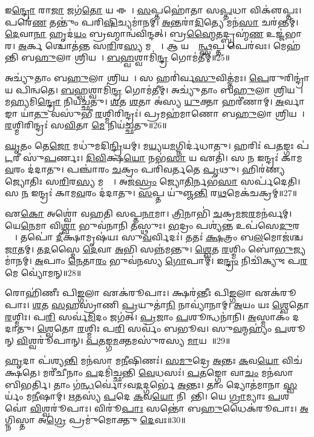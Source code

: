 𑌇\ul{𑌨𑍍𑌦𑍍𑌰𑍋} 𑌰𑌾\ul{𑌜𑌾} 𑌜𑌗॑\ul{𑌤𑍋} 𑌯 𑌈𑌶𑍇᳚। 
\ul{𑌸}𑌪𑍍𑌤𑌹𑍋॑𑌤𑌾 𑌸\ul{𑌪𑍍𑌤}𑌧𑌾 𑌵𑌿𑌕𑍢॑𑌪𑍍𑌤𑌃। 
𑌪𑌰𑍇॑\ul{𑌣} 𑌤𑌨𑍍𑌤𑍁𑌂॑ 𑌪𑌰𑌿\ul{𑌷𑌿}𑌚𑍍𑌯𑌮𑌾॑𑌨𑌮𑍍। 
\ul{𑌅}𑌨𑍍𑌤𑌰𑌾॑\ul{𑌦𑌿}𑌤𑍍𑌯𑍇 𑌮𑌨॑\ul{𑌸𑌾} 𑌚𑌰॑𑌨𑍍𑌤𑌮𑍍। 
\ul{𑌦𑍇}𑌵𑌾\ul{𑌨𑌾}\ul{} 𑌹𑍃𑌦॑\ul{𑌯𑌂} 𑌬𑍍𑌰𑌹𑍍𑌮𑌾𑌨𑍍𑌵॑𑌵𑌿𑌨𑍍𑌦𑌤𑍍। 
𑌬𑍍𑌰\ul{𑌹𑍍𑌮𑍈}𑌤𑌦𑍍𑌬𑍍𑌰𑌹𑍍𑌮॑\ul{𑌣} 𑌉𑌜𑍍𑌜॑𑌭𑌾𑌰। 
\ul{𑌅}𑌰𑍍𑌕 𑌶𑍍𑌚𑍋𑌤॑𑌨𑍍𑌤 𑌸\ul{𑌰𑌿}𑌰\ul{𑌸𑍍𑌯} 𑌮𑌧𑍍𑌯𑍇᳚। 
𑌆 𑌯𑌸𑍍𑌮𑌿᳚\ul{𑌨𑍍𑌥𑍍𑌸}𑌪𑍍𑌤 𑌪𑍇𑌰॑𑌵𑌃। 
𑌮𑍇𑌹॑𑌨𑍍𑌤𑌿 𑌬\ul{𑌹𑍁}𑌲𑌾 𑌶𑍍𑌰𑌿𑌯𑌮𑍍᳚। 
\ul{𑌬}\ul{𑌹𑍍𑌵}𑌶𑍍𑌵𑌾𑌮𑌿॑\ul{𑌨𑍍𑌦𑍍𑌰} 𑌗𑍋𑌮॑𑌤𑍀𑌮𑍍॥25॥%

𑌅𑌚𑍍𑌯𑍁॑𑌤𑌾𑌂 𑌬\ul{𑌹𑍁}𑌲𑌾 𑌶𑍍𑌰𑌿𑌯𑌮𑍍᳚। 
𑌸 𑌹𑌰𑌿॑𑌰𑍍𑌵\ul{𑌸𑍁}𑌵𑌿𑌤𑍍𑌤॑𑌮𑌃। 
\ul{𑌪𑍇}𑌰𑍁𑌰𑌿𑌨𑍍𑌦𑍍𑌰𑌾॑𑌯 𑌪𑌿𑌨𑍍𑌵𑌤𑍇। 
\ul{𑌬}\ul{𑌹𑍍𑌵}𑌶𑍍𑌵𑌾𑌮𑌿॑\ul{𑌨𑍍𑌦𑍍𑌰} 𑌗𑍋𑌮॑𑌤𑍀𑌮𑍍। 
𑌅𑌚𑍍𑌯𑍁॑𑌤𑌾𑌂 𑌬\ul{𑌹𑍁}𑌲𑌾 𑌶𑍍𑌰𑌿𑌯𑌮𑍍᳚। 
𑌮\ul{𑌹𑍍𑌯}𑌮𑌿\ul{𑌨𑍍𑌦𑍍𑌰𑍋} 𑌨𑌿𑌯॑𑌚𑍍𑌛𑌤𑍁। 
\ul{𑌶}𑌤 \ul{𑌶}𑌤𑌾 𑌅॑𑌸𑍍𑌯 \ul{𑌯𑍁}𑌕𑍍𑌤𑌾 𑌹𑌰𑍀॑𑌣𑌾𑌮𑍍। 
\ul{𑌅}𑌰𑍍𑌵𑌾𑌙𑌾 𑌯𑌾॑\ul{𑌤𑍁} 𑌵𑌸𑍁॑𑌭𑍀 \ul{𑌰}𑌶𑍍𑌮𑌿𑌰𑌿𑌨𑍍𑌦𑍍𑌰𑌃॑। 
𑌪𑍍𑌰𑌮𑌹॑𑌮𑌾𑌣𑍋 𑌬\ul{𑌹𑍁}𑌲𑌾 𑌶𑍍𑌰𑌿𑌯𑌮𑍍᳚। 
\ul{𑌰}𑌶𑍍𑌮𑌿𑌰𑌿𑌨𑍍𑌦𑍍𑌰𑌃॑ 𑌸\ul{𑌵𑌿}𑌤𑌾 \ul{𑌮𑍇} 𑌨𑌿𑌯॑𑌚𑍍𑌛𑌤𑍁॥26॥%

\ul{𑌘𑍃}𑌤𑌂 𑌤𑍇\ul{𑌜𑍋} 𑌮𑌧𑍁॑𑌮𑌦𑌿\ul{𑌨𑍍𑌦𑍍𑌰𑌿}𑌯𑌮𑍍। 
𑌮\ul{𑌯𑍍𑌯}𑌯\ul{𑌮}𑌗𑍍𑌨𑌿𑌰𑍍𑌦॑𑌧𑌾𑌤𑍁। 
𑌹𑌰𑌿𑌃॑ 𑌪\ul{𑌤}𑌙𑍍𑌗𑌃 𑌪॑\ul{𑌟}𑌰𑍀 𑌸𑍁॑\ul{𑌪}𑌰𑍍𑌣𑌃। 
\ul{𑌦𑌿}\ul{𑌵𑌿}𑌕𑍍𑌷\ul{𑌯𑍋} 𑌨𑌭॑\ul{𑌸𑌾} 𑌯 𑌏𑌤𑌿॑। 
𑌸 \ul{𑌨} 𑌇𑌨𑍍𑌦𑍍𑌰𑌃॑ 𑌕𑌾𑌮\ul{𑌵}𑌰𑌂 𑌦॑𑌦𑌾𑌤𑍁। 
𑌪𑌞𑍍𑌚𑌾॑𑌰𑌂 \ul{𑌚}𑌕𑍍𑌰𑌂 𑌪𑌰𑌿॑𑌵𑌰𑍍𑌤𑌤𑍇 \ul{𑌪𑍃}𑌥𑍁। 
𑌹𑌿𑌰॑𑌣𑍍𑌯𑌜𑍍𑌯𑍋𑌤𑌿𑌃 𑌸\ul{𑌰𑌿}𑌰\ul{𑌸𑍍𑌯} 𑌮𑌧𑍍𑌯𑍇᳚। 
𑌅𑌜॑\ul{𑌸𑍍𑌰𑌂} 𑌜𑍍𑌯𑍋\ul{𑌤𑌿}𑌰𑍍𑌨𑌭॑\ul{𑌸𑌾} 𑌸𑌰𑍍𑌪॑𑌦𑍇𑌤𑌿। 
𑌸 \ul{𑌨} 𑌇𑌨𑍍𑌦𑍍𑌰𑌃॑ 𑌕𑌾𑌮\ul{𑌵}𑌰𑌂 𑌦॑𑌦𑌾𑌤𑍁। 
\ul{𑌸}𑌪𑍍𑌤 𑌯𑍁॑𑌞𑍍𑌜\ul{𑌨𑍍𑌤𑌿} 𑌰\ul{𑌥}𑌮𑍇𑌕॑𑌚𑌕𑍍𑌰𑌮𑍍॥27॥%

𑌏\ul{𑌕𑍋} 𑌅𑌶𑍍𑌵𑍋॑ 𑌵𑌹𑌤𑌿 𑌸𑌪𑍍𑌤\ul{𑌨𑌾}𑌮𑌾। 
\ul{𑌤𑍍𑌰𑌿}𑌨𑌾𑌭𑌿॑ \ul{𑌚}𑌕𑍍𑌰\ul{𑌮}𑌜\ul{𑌰}𑌮𑌨॑𑌰𑍍𑌵𑌮𑍍। 
𑌯𑍇\ul{𑌨𑍇}𑌮𑌾 𑌵𑌿\ul{𑌶𑍍𑌵𑌾} 𑌭𑍁𑌵॑𑌨𑌾𑌨𑌿 𑌤𑌸𑍍𑌥𑍁𑌃। 
\ul{𑌭}𑌦𑍍𑌰𑌂 𑌪𑌶𑍍𑌯॑\ul{𑌨𑍍𑌤} 𑌉𑌪॑𑌸𑍇\ul{𑌦𑍁}𑌰𑌗𑍍𑌰𑍇᳚। 
𑌤𑌪𑍋॑ \ul{𑌦𑍀}𑌕𑍍𑌷𑌾𑌮𑍃𑌷॑𑌯𑌃 𑌸𑍁\ul{𑌵}𑌰𑍍𑌵𑌿𑌦𑌃॑। 
𑌤𑌤𑌃॑ \ul{𑌕𑍍𑌷}𑌤𑍍𑌰𑌂 𑌬\ul{𑌲}𑌮𑍋𑌜॑𑌶𑍍𑌚 \ul{𑌜𑌾}𑌤𑌮𑍍। 
𑌤\ul{𑌦}𑌸𑍍𑌮𑍈 \ul{𑌦𑍇}𑌵𑌾 \ul{𑌅}𑌭𑌿 𑌸𑌨𑍍𑌨॑𑌮𑌨𑍍𑌤𑍁। 
\ul{𑌶𑍍𑌵𑍇}𑌤 \ul{𑌰}𑌶𑍍𑌮𑌿𑌂 𑌬𑍋॑\ul{𑌭𑍁}𑌜𑍍𑌯𑌮𑌾॑𑌨𑌮𑍍। 
\ul{𑌅}𑌪𑌾𑌂 \ul{𑌨𑍇}𑌤𑌾\ul{𑌰𑌂} 𑌭𑍁𑌵॑𑌨𑌸𑍍𑌯 \ul{𑌗𑍋}𑌪𑌾𑌮𑍍। 
𑌇\ul{𑌨𑍍𑌦𑍍𑌰𑌂} 𑌨𑌿𑌚𑌿॑𑌕𑍍𑌯𑍁𑌃 𑌪\ul{𑌰}𑌮𑍇 𑌵𑍍𑌯𑍋॑𑌮𑌨𑍍॥28॥

𑌰𑍋𑌹𑌿॑𑌣𑍀𑌃 𑌪𑌿\ul{𑌙𑍍𑌗}𑌲𑌾 𑌏𑌕॑𑌰𑍂𑌪𑌾𑌃। 
𑌕𑍍𑌷𑌰॑𑌨𑍍𑌤𑍀𑌃 𑌪𑌿\ul{𑌙𑍍𑌗}𑌲𑌾 𑌏𑌕॑𑌰𑍂𑌪𑌾𑌃। 
\ul{𑌶}𑌤 \ul{𑌸}𑌹𑌸𑍍𑌰𑌾॑𑌣𑌿 \ul{𑌪𑍍𑌰}𑌯𑍁𑌤𑌾॑\ul{𑌨𑌿} 𑌨𑌾𑌵𑍍𑌯𑌾॑𑌨𑌾𑌮𑍍। 
\ul{𑌅}𑌯𑌂 𑌯𑌃 \ul{𑌶𑍍𑌵𑍇}𑌤𑍋 \ul{𑌰}𑌶𑍍𑌮𑌿𑌃। 
𑌪\ul{𑌰𑌿} 𑌸𑌰𑍍𑌵॑\ul{𑌮𑌿}𑌦𑌂 𑌜𑌗॑𑌤𑍍। 
\ul{𑌪𑍍𑌰}𑌜𑌾𑌂 \ul{𑌪}𑌶𑍂𑌨𑍍𑌧𑌨𑌾॑𑌨𑌿। 
\ul{𑌅}𑌸𑍍𑌮𑌾𑌕𑌂॑ 𑌦𑌦𑌾𑌤𑍁। 
\ul{𑌶𑍍𑌵𑍇}𑌤𑍋 \ul{𑌰}𑌶𑍍𑌮𑌿𑌃 𑌪\ul{𑌰𑌿} 𑌸𑌰𑍍𑌵𑌂॑ 𑌬𑌭𑍂𑌵। 
𑌸𑍁\ul{𑌵}𑌨𑍍𑌮𑌹𑍍𑌯𑌂॑ \ul{𑌪}𑌶𑍂𑌨𑍍 \ul{𑌵𑌿}𑌶𑍍𑌵𑌰𑍂॑𑌪𑌾𑌨𑍍। 
\ul{𑌪}\ul{𑌤}𑌙𑍍𑌗\ul{𑌮}𑌕𑍍𑌤𑌮𑌸𑍁॑𑌰𑌸𑍍𑌯 \ul{𑌮𑌾}𑌯𑌯𑌾᳚॥29॥%

\ul{𑌹𑍃}𑌦𑌾 𑌪॑𑌶𑍍𑌯\ul{𑌨𑍍𑌤𑌿} 𑌮𑌨॑𑌸𑌾 𑌮\ul{𑌨𑍀}𑌷𑌿𑌣𑌃॑। 
\ul{𑌸}\ul{𑌮𑍁}𑌦𑍍𑌰𑍇 \ul{𑌅}𑌨𑍍𑌤𑌃 \ul{𑌕}𑌵\ul{𑌯𑍋} 𑌵𑌿𑌚॑𑌕𑍍𑌷𑌤𑍇। 
𑌮𑌰𑍀॑𑌚𑍀𑌨𑌾𑌂 \ul{𑌪}𑌦𑌮𑌿॑𑌚𑍍𑌛𑌨𑍍𑌤𑌿 \ul{𑌵𑍇}𑌧𑌸𑌃॑। 
\ul{𑌪}\ul{𑌤}𑌙𑍍𑌗𑍋 𑌵𑌾\ul{𑌚𑌂} 𑌮𑌨॑𑌸𑌾 𑌬𑌿𑌭𑌰𑍍𑌤𑌿। 
𑌤𑌾𑌂 𑌗॑\ul{𑌨𑍍𑌧}𑌰𑍍𑌵𑍋॑𑌽𑌵\ul{𑌦}𑌦𑍍𑌗𑌰𑍍𑌭𑍇॑ \ul{𑌅}𑌨𑍍𑌤𑌃। 
𑌤𑌾𑌂 𑌦𑍍𑌯𑍋𑌤॑𑌮𑌾𑌨𑌾 \ul{𑌸𑍍𑌵}𑌰𑍍𑌯𑌂॑ 𑌮\ul{𑌨𑍀}𑌷𑌾𑌮𑍍। 
\ul{𑌋}𑌤𑌸𑍍𑌯॑ \ul{𑌪}𑌦𑍇 \ul{𑌕}𑌵\ul{𑌯𑍋} 𑌨𑌿𑌪𑌾᳚𑌨𑍍𑌤𑌿। 
𑌯𑍇 \ul{𑌗𑍍𑌰𑌾}𑌮𑍍𑌯𑌾𑌃 \ul{𑌪}𑌶𑌵𑍋॑ \ul{𑌵𑌿}𑌶𑍍𑌵𑌰𑍂॑𑌪𑌾𑌃। 
𑌵𑌿𑌰𑍂॑\ul{𑌪𑌾𑌃} 𑌸𑌨𑍍𑌤𑍋॑ 𑌬\ul{𑌹𑍁}𑌧𑍈𑌕॑𑌰𑍂𑌪𑌾𑌃। 
\ul{𑌅}𑌗𑍍𑌨𑌿𑌸𑍍𑌤𑌾 𑌅\ul{𑌗𑍍𑌰𑍇} 𑌪𑍍𑌰𑌮𑍁॑𑌮𑍋𑌕𑍍𑌤𑍁 \ul{𑌦𑍇}𑌵𑌃॥30॥

